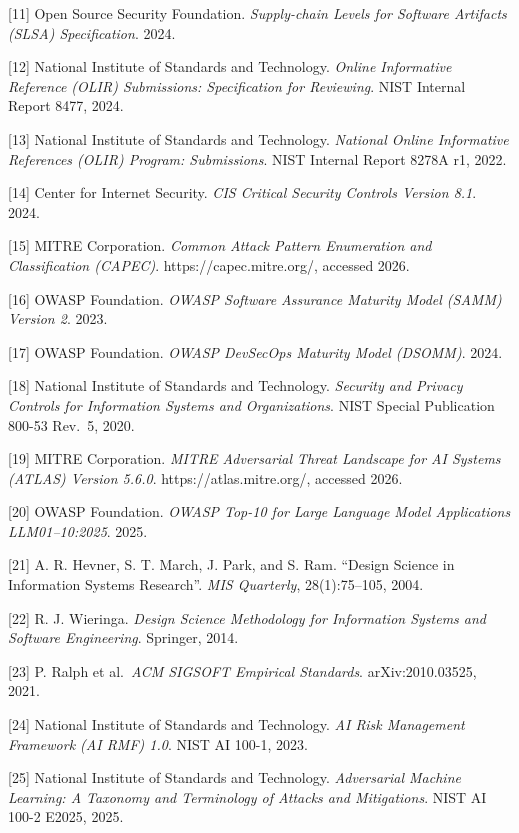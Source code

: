 \documentclass[
]{article}
\begin{document}
{[}11{]} Open Source Security Foundation. \emph{Supply-chain Levels for
Software Artifacts (SLSA) Specification}. 2024.

{[}12{]} National Institute of Standards and Technology. \emph{Online
Informative Reference (OLIR) Submissions: Specification for Reviewing}.
NIST Internal Report 8477, 2024.

{[}13{]} National Institute of Standards and Technology. \emph{National
Online Informative References (OLIR) Program: Submissions}. NIST
Internal Report 8278A r1, 2022.

{[}14{]} Center for Internet Security. \emph{CIS Critical Security
Controls Version 8.1}. 2024.

{[}15{]} MITRE Corporation. \emph{Common Attack Pattern Enumeration and
Classification (CAPEC)}. https://capec.mitre.org/, accessed 2026.

{[}16{]} OWASP Foundation. \emph{OWASP Software Assurance Maturity Model
(SAMM) Version 2}. 2023.

{[}17{]} OWASP Foundation. \emph{OWASP DevSecOps Maturity Model
(DSOMM)}. 2024.

{[}18{]} National Institute of Standards and Technology. \emph{Security
and Privacy Controls for Information Systems and Organizations}. NIST
Special Publication 800-53 Rev.~5, 2020.

{[}19{]} MITRE Corporation. \emph{MITRE Adversarial Threat Landscape for
AI Systems (ATLAS) Version 5.6.0}. https://atlas.mitre.org/, accessed
2026.

{[}20{]} OWASP Foundation. \emph{OWASP Top-10 for Large Language Model
Applications LLM01--10:2025}. 2025.

{[}21{]} A. R. Hevner, S. T. March, J. Park, and S. Ram. ``Design
Science in Information Systems Research''. \emph{MIS Quarterly},
28(1):75--105, 2004.

{[}22{]} R. J. Wieringa. \emph{Design Science Methodology for
Information Systems and Software Engineering}. Springer, 2014.

{[}23{]} P. Ralph et al.~\emph{ACM SIGSOFT Empirical Standards}.
arXiv:2010.03525, 2021.

{[}24{]} National Institute of Standards and Technology. \emph{AI Risk
Management Framework (AI RMF) 1.0}. NIST AI 100-1, 2023.

{[}25{]} National Institute of Standards and Technology.
\emph{Adversarial Machine Learning: A Taxonomy and Terminology of
Attacks and Mitigations}. NIST AI 100-2 E2025, 2025.
\end{document}
